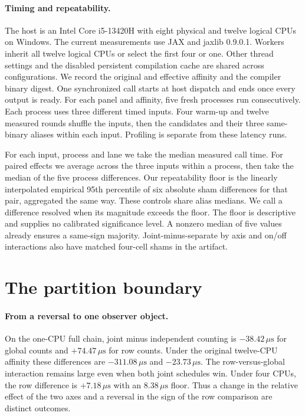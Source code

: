 \documentclass[sigplan,10pt,review,anonymous,nonacm]{acmart}
\newcommand{\us}{\ensuremath{\,\mu\mathrm{s}}}
\begin{document}
\paragraph{Timing and repeatability.}
The host is an Intel Core i5-13420H with eight physical and twelve logical CPUs on Windows. The current measurements use JAX and jaxlib 0.9.0.1. Workers inherit all twelve logical CPUs or select the first four or one. Other thread settings and the disabled persistent compilation cache are shared across configurations. We record the original and effective affinity and the compiler binary digest. One synchronized call starts at host dispatch and ends once every output is ready. For each panel and affinity, five fresh processes run consecutively. Each process uses three different timed inputs. Four warm-up and twelve measured rounds shuffle the inputs, then the candidates and their three same-binary aliases within each input. Profiling is separate from these latency runs.

For each input, process and lane we take the median measured call time. For paired effects we average across the three inputs within a process, then take the median of the five process differences. Our repeatability floor is the linearly interpolated empirical 95th percentile of six absolute sham differences for that pair, aggregated the same way. These controls share alias medians. We call a difference resolved when its magnitude exceeds the floor. The floor is descriptive and supplies no calibrated significance level. A nonzero median of five values already ensures a same-sign majority. Joint-minus-separate by axis and on/off interactions also have matched four-cell shams in the artifact.

\section{The partition boundary}
\paragraph{From a reversal to one observer object.}
On the one-CPU full chain, joint minus independent counting is $-38.42$\us{} for global counts and $+74.47$\us{} for row counts. Under the original twelve-CPU affinity these differences are $-311.08$\us{} and $-23.73$\us{}. The row-versus-global interaction remains large even when both joint schedules win. Under four CPUs, the row difference is $+7.18$\us{} with an $8.38$\us{} floor. Thus a change in the relative effect of the two axes and a reversal in the sign of the row comparison are distinct outcomes.
\end{document}

